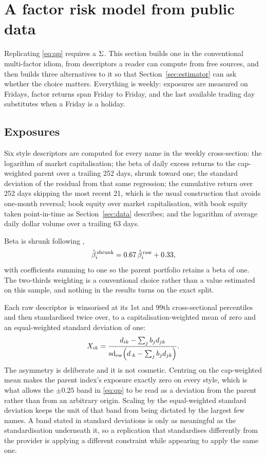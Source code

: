 \section{A factor risk model from public data}
\label{sec:model}
Replicating \eqref{eq:qp} requires a $\Sigma$. This section builds one in the
conventional multi-factor idiom, from descriptors a reader can compute from
free sources, and then builds three alternatives to it so that
Section~\ref{sec:estimator} can ask whether the choice matters. Everything is
weekly: exposures are measured on Fridays, factor returns span Friday to
Friday, and the last available trading day substitutes when a Friday is a
holiday.

\subsection{Exposures}
Six style descriptors are computed for every name in the weekly cross-section:
the logarithm of market capitalisation; the beta of daily excess returns to the
cap-weighted parent over a trailing 252 days, shrunk toward one; the standard
deviation of the residual from that same regression; the cumulative return over
252 days skipping the most recent 21, which is the usual construction that
avoids one-month reversal; book equity over market capitalisation, with book
equity taken point-in-time as Section~\ref{sec:data} describes; and the
logarithm of average daily dollar volume over a trailing 63 days.

Beta is shrunk following \citet{blume1971assessment},
\begin{equation}
 \hat\beta_i^{\,\rm shrunk} = 0.67\,\hat\beta_i^{\,\rm raw} + 0.33,
 \label{eq:blume}
\end{equation}
with coefficients summing to one so the parent portfolio retains a beta of one.
The two-thirds weighting is a conventional choice rather than a value estimated
on this sample, and nothing in the results turns on the exact split.

Each raw descriptor is winsorised at its 1st and 99th cross-sectional
percentiles and then standardised twice over, to a capitalisation-weighted mean
of zero and an equal-weighted standard deviation of one:
\begin{equation}
 X_{ik} = \frac{d_{ik} - \sum_j b_j d_{jk}}
               {\operatorname{sd}_{\rm ew}\!\left(d_{\cdot k} -
                \textstyle\sum_j b_j d_{jk}\right)}.
 \label{eq:standardise}
\end{equation}
The asymmetry is deliberate and it is not cosmetic. Centring on the
cap-weighted mean makes the parent index's exposure exactly zero on every
style, which is what allows the $\pm0.25$ band in \eqref{eq:qp} to be read as a
deviation from the parent rather than from an arbitrary origin. Scaling by the
equal-weighted standard deviation keeps the unit of that band from being
dictated by the largest few names. A band stated in standard deviations is only
as meaningful as the standardisation underneath it, so a replication that
standardises differently from the provider is applying a different constraint
while appearing to apply the same one.

